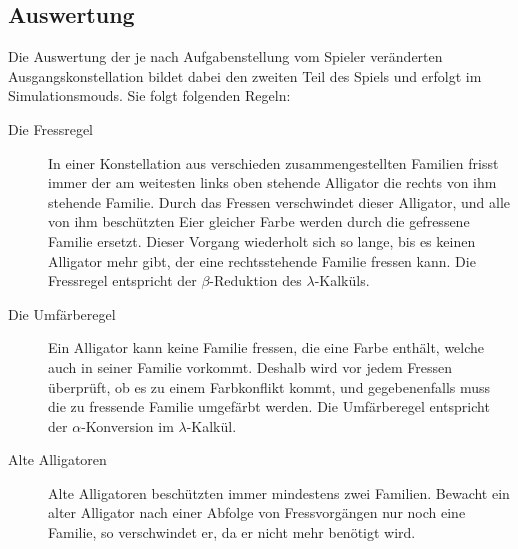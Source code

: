 \subsection{Auswertung}
Die Auswertung der je nach Aufgabenstellung vom Spieler veränderten Ausgangskonstellation bildet dabei den zweiten Teil des Spiels und erfolgt im Simulationsmouds. 
Sie folgt folgenden Regeln:

\begin{description}
                \item[Die Fressregel] In einer Konstellation aus verschieden zusammengestellten Familien frisst immer der am weitesten links oben stehende Alligator die rechts von ihm stehende Familie.
                Durch das Fressen verschwindet dieser Alligator, und alle von ihm beschützten Eier gleicher Farbe werden durch die gefressene Familie ersetzt.
                Dieser Vorgang wiederholt sich so lange, bis es keinen Alligator mehr gibt, der eine rechtsstehende Familie fressen kann.
                Die Fressregel entspricht der \(\beta\)-Reduktion des \(\lambda\)-Kalküls.

                \item[Die Umfärberegel] Ein Alligator kann keine Familie fressen, die eine Farbe enthält, welche auch in seiner Familie vorkommt.
                Deshalb wird vor jedem Fressen überprüft, ob es zu einem Farbkonflikt kommt, und gegebenenfalls muss die zu fressende Familie umgefärbt werden.
                Die Umfärberegel entspricht der \(\alpha\)-Konversion im \(\lambda\)-Kalkül.

                \item[Alte Alligatoren] Alte Alligatoren beschützten immer mindestens zwei Familien.
                Bewacht ein alter Alligator nach einer Abfolge von Fressvorgängen nur noch eine Familie, so verschwindet er, da er nicht mehr benötigt wird.

        \end{description}
